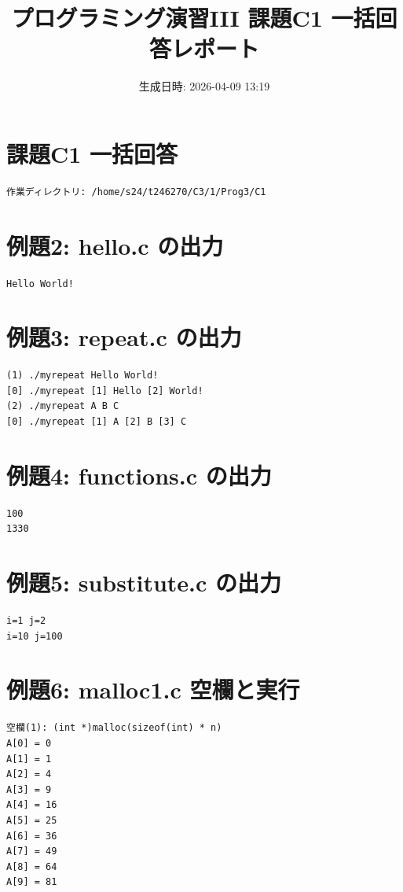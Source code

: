 \documentclass[uplatex,dvipdfmx,a4paper,11pt]{jsarticle}
\title{プログラミング演習III 課題C1 一括回答レポート}
\date{生成日時: 2026-04-09 13:19}
\begin{document}
\maketitle
\tableofcontents
\newpage
\section*{課題C1 一括回答}
\begin{Verbatim}[fontsize=\small,frame=single]
作業ディレクトリ: /home/s24/t246270/C3/1/Prog3/C1
\end{Verbatim}
\section*{例題2: hello.c の出力}
\begin{Verbatim}[fontsize=\small,frame=single]
Hello World!
\end{Verbatim}
\section*{例題3: repeat.c の出力}
\begin{Verbatim}[fontsize=\small,frame=single]
(1) ./myrepeat Hello World!
[0] ./myrepeat [1] Hello [2] World! 
(2) ./myrepeat A B C
[0] ./myrepeat [1] A [2] B [3] C
\end{Verbatim}
\section*{例題4: functions.c の出力}
\begin{Verbatim}[fontsize=\small,frame=single]
100
1330
\end{Verbatim}
\section*{例題5: substitute.c の出力}
\begin{Verbatim}[fontsize=\small,frame=single]
i=1 j=2
i=10 j=100
\end{Verbatim}
\section*{例題6: malloc1.c 空欄と実行}
\begin{Verbatim}[fontsize=\small,frame=single]
空欄(1): (int *)malloc(sizeof(int) * n)
A[0] = 0
A[1] = 1
A[2] = 4
A[3] = 9
A[4] = 16
A[5] = 25
A[6] = 36
A[7] = 49
A[8] = 64
A[9] = 81
\end{Verbatim}
\end{document}
